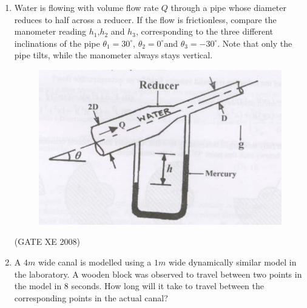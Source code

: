 \documentclass[12pt]{article}
\begin{document}
\begin{enumerate}
\begin{enumerate}
\end{enumerate}

(GATE XE 2008)
\item Water is flowing with volume flow rate $Q$ through a pipe whose diameter reduces to half across a reducer. If the flow is frictionless, compare the manometer reading $h_1$,$h_2$ and $h_3$, corresponding to the three different inclinations of the pipe $\theta _1 = 30^{\circ}$, $\theta _2 = 0^{\circ}$and $\theta _3 =-30^{\circ}$. Note that only the pipe tilts, while the manometer always stays vertical.

\begin{figure}[H]
\centering
  \includegraphics[width=0.5\columnwidth]{figs/ass1_d_q18.png}
  \caption{}
\end{figure} 

\begin{enumerate}
\end{enumerate}

(GATE XE 2008)
\item A $4 m$ wide canal is modelled using a $1 m$ wide dynamically similar model in the laboratory. A wooden block was observed to travel between two points in the model in $8$ seconds. How long will it take to travel between the corresponding points in the actual canal?


\end{enumerate}
\end{document}
